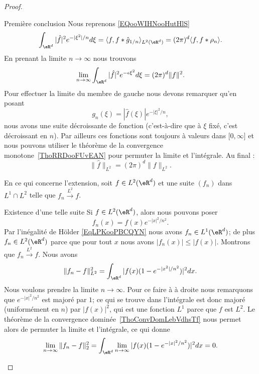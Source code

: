\begin{proof}
\begin{subproof}
		\item[Première conclusion]
		Nous reprenons \eqref{EQooWIHNooHutHlS}
		\begin{equation}
			\int_{\eR^d}| \hat f |^2 e^{-| \xi^2 |/n}d\xi=\langle f, f*\hat g_{1/n}\rangle_{L^2(\eR^d)}=(2\pi)^d\langle f, f* \rho_n \rangle .
		\end{equation}
		En prenant la limite \( n\to \infty\) nous trouvons
		\begin{equation}
			\lim_{n\to \infty}\int_{\eR^d}| \hat f |^2 e^{-\epsilon\xi^2}d\xi=(2\pi)^d\| f \|^2.
		\end{equation}
		Pour effectuer la limite du membre de gauche nous devons remarquer qu'en posant
		\begin{equation}
			g_n(\xi)=| \hat f(\xi) | e^{-| \xi |^2/n},
		\end{equation}
		nous avons une suite décroissante de fonction (c'est-à-dire que à \( \xi\) fixé, c'est décroissant en \(n\)). Par ailleurs ces fonctions sont toujours à valeurs dans \( \mathopen[ 0 , \infty \mathclose]\) et nous pouvons utiliser le théorème de la convergence monotone~\ref{ThoRRDooFUvEAN} pour permuter la limite et l'intégrale. Au final :
		\begin{equation}
			\| \hat f \|_{L^2}=(2\pi)^d\| f \|_{L^2}.
		\end{equation}
	\end{subproof}

	En ce qui concerne l'extension, soit \( f\in L^2(\eR^d)\) et une suite \( (f_n)\) dans \( L^1\cap L^2\) telle que \( f_n\stackrel{L^2}{\longrightarrow}f\).
	\begin{subproof}
		\item[Existence d'une telle suite]
		Si \( f\in L^2(\eR^d)\), alors nous pouvons poser
		\begin{equation}    \label{EQooHGJYooJsmxoX}
			f_n(x)=f(x) e^{-|x|^2/n^2}.
		\end{equation}
		Par l'inégalité de Hölder \eqref{EqLPKooPBCQYN} nous avons \( f_n\in L^1(\eR^d)\); de plus \( f_n\in L^2(\eR^d)\) parce que pour tout \( x\) nous avons \( | f_n(x) |\leq | f(x) |\). Montrons que \( f_n\stackrel{L^2}{\longrightarrow}f\). Nous avons
		\begin{equation}
			\| f_n-f \|_{L^2}^2=\int_{\eR^d}| f(x)(1- e^{-| x^2 |/n^2}) |^2dx.
		\end{equation}
		Nous voulons prendre la limite \( n\to \infty\). Pour ce faire à à droite nous remarquons que \(  e^{-| x |^2/n^2}\) est majoré par \( 1\); ce qui se trouve dans l'intégrale est donc majoré (uniformément en \( n\)) par \( | f(x) |^2\), qui est une fonction \( L^1\) parce que \( f\) est \( L^2\). Le théorème de la convergence dominée~\ref{ThoConvDomLebVdhsTf} nous permet alors de permuter la limite et l'intégrale, ce qui donne
		\begin{equation}
			\lim_{n\to \infty} \| f_n-f \|_2^2=\int_{\eR^d}\lim_{n\to \infty} | f(x)(1- e^{-| x |^2/n^2}) |^2dx=0.
		\end{equation}


\end{subproof}
\end{proof}
